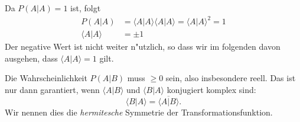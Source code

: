 Da $P(A|A) =1$ ist, folgt
\begin{align*}
P(A|A)&=\langle A|A\rangle \langle A|A\rangle = \langle A|A\rangle^2 = 1
\\
\langle A|A\rangle&=\pm 1
\end{align*}
Der negative Wert ist nicht weiter n"utzlich, so dass wir im folgenden
davon ausgehen, dass $\langle A|A\rangle = 1$ gilt.

Die Wahrscheinlichkeit $P(A|B)$ muss $\ge 0$ sein, also insbesondere
reell. Das ist nur dann garantiert, wenn $\langle A|B\rangle$ und
$\langle B|A\rangle$ konjugiert komplex sind:
\begin{equation}
\langle B|A\rangle
=\overline{\langle A|B\rangle}.
\label{skript:hermiteschesymmetrie}
\end{equation}
Wir nennen dies die {\em hermitesche} Symmetrie der Transformationsfunktion.

